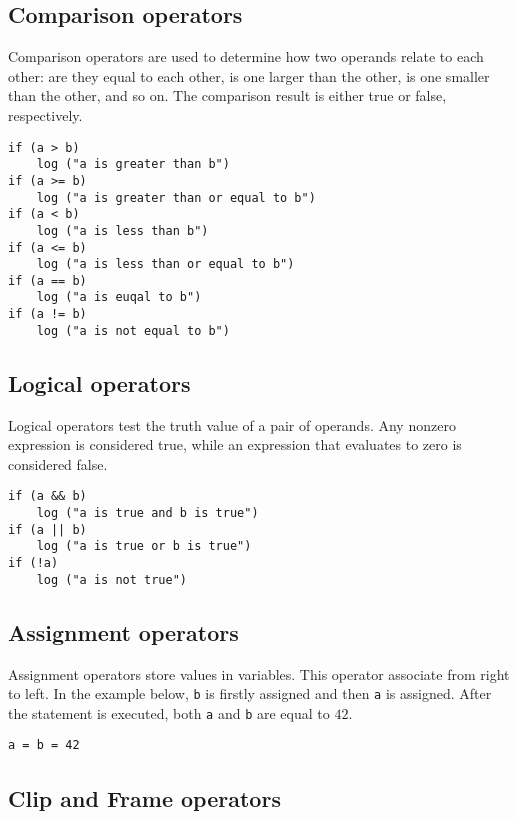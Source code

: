 \documentclass[12pt]{article}
\begin{document}
\subsection{Comparison operators} %
Comparison operators are used to determine how two operands relate to each other: are they equal to each other, is one larger than the other, is one smaller than the other, and so on. The comparison result is either true or false, respectively.
\begin{mdframed}[backgroundcolor=lightgray,hidealllines=true]
\begin{verbatim}
if (a > b)
    log ("a is greater than b")
if (a >= b)
    log ("a is greater than or equal to b")
if (a < b)
    log ("a is less than b")
if (a <= b)
    log ("a is less than or equal to b")
if (a == b)
    log ("a is euqal to b")
if (a != b)
    log ("a is not equal to b")
\end{verbatim}
\end{mdframed}
\subsection{Logical operators} %
Logical operators test the truth value of a pair of operands. Any nonzero expression is considered true, while an expression that evaluates to zero is considered false.
\begin{mdframed}[backgroundcolor=lightgray,hidealllines=true]
\begin{verbatim}
if (a && b)
    log ("a is true and b is true")
if (a || b)
    log ("a is true or b is true")
if (!a)
    log ("a is not true")
\end{verbatim}
\end{mdframed}
\subsection{Assignment operators} %
Assignment operators store values in variables. This operator associate from right to left. In the example below, \texttt{b} is firstly assigned and then \texttt{a} is assigned. After the statement is executed, both \texttt{a} and \texttt{b} are equal to $42$.
\begin{mdframed}[backgroundcolor=lightgray,hidealllines=true]
\begin{verbatim}
a = b = 42
\end{verbatim}
\end{mdframed}

\subsection{Clip and Frame operators}
\end{document}

